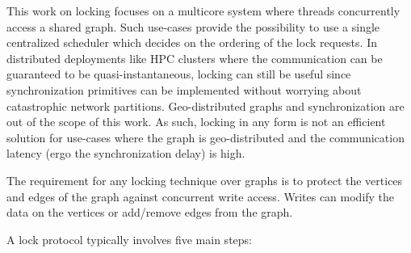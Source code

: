 This work on locking focuses on a multicore system where threads concurrently access a shared graph. Such use-cases provide the possibility to use a single centralized scheduler which decides on the ordering of the lock requests. In distributed deployments like HPC clusters where the communication can be guaranteed to be quasi-instantaneous, locking can still be useful since synchronization primitives can be implemented without worrying about catastrophic network partitions. Geo-distributed graphs and synchronization are out of the scope of this work. As such, locking in any form is not an efficient solution for use-cases where the graph is geo-distributed and the communication latency (ergo the synchronization delay) is high. 

The requirement for any locking technique over graphs is to protect the vertices and edges of the graph against concurrent write access. Writes can modify the data on the vertices or add/remove edges from the graph. 

A lock protocol typically involves five main steps:

